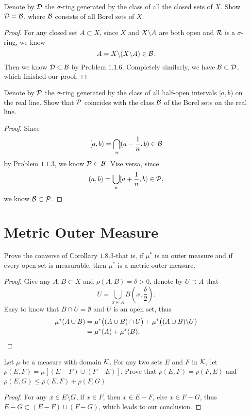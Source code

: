 \begin{pro}%
	Denote by $\mathcal{D}$ the $\sigma$-ring generated by the class of all the closed sets of $X$. Show $\mathcal{D}=\mathcal{B}$, where $\mathcal{B}$ consists of all Borel sets of $X$.
\end{pro}
\begin{proof}
	For any closed set $A\subset X$, since $X$ and $X\backslash A$ are both open and $\mathcal{R}$ is a $\sigma$-ring, we know
	\[A=X\backslash(X\backslash A)\in \mathcal{B}.\]
	 Then we know $\mathcal{D}\subset\mathcal{B}$ by Problem $1.1.6$. Completely similarly, we have $\mathcal{B}\subset\mathcal{D}$, which finished our proof.
\end{proof}

\begin{pro}%
	Denote by $\mathcal{P}$ the $\sigma$-ring generated by the class of all half-open intervals $[a,b)$ on the real line. Show that $\mathcal{P}$ coincides with the class $\mathcal{B}$ of the Borel sets on the real line.
\end{pro}
\begin{proof}
	Since 
	\[[a,b)=\bigcap_{n} (a-\frac{1}{n},b)\in\mathcal{B}\]
	by Problem $1.1.3$, we know $\mathcal{P}\subset \mathcal{B}$. Vise versa, since
	\[(a,b)=\bigcup_{n} [a+\frac{1}{n},b)\in\mathcal{P},\]
	we know $\mathcal{B}\subset\mathcal{P}$. 
\end{proof}

\section{Metric Outer Measure}
\begin{pro}%
	Prove the converse of Corollary $1.8.3$-that is, if $\mu^*$ is an outer measure and if every open set is measurable, then $\mu^*$ is a metric outer measure.
\end{pro}
\begin{proof}
	Give any $A,B\subset X$ and $\rho(A,B)=\delta>0$, denote by $U\supset A$ that 
	\[U=\bigcup_{x\in A} B(x,\frac{\delta}{2}).\]
	Easy to know that $B\cap U=\emptyset$ and $U$ is an open set, thus
	\begin{align*}
		\mu^*(A\cup B)&=\mu^*\big((A\cup B)\cap U\big)+\mu^*\big((A\cup B)\backslash U\big)\\
		&=\mu^*(A)+\mu^*(B).
	\end{align*}
\end{proof}

\begin{pro}%
	Let $\mu$ be a measure with domain $\mathcal{K}$. For any two sets $E$ and $F$ in $\mathcal{K}$, let $\rho(E,F)=\mu[(E-F)\cup(F-E)].$ Prove that $\rho(E,F)=\rho(F,E)$ and $\rho(E,G)\leq\rho(E,F)+\rho(F,G)$.
\end{pro}
\begin{proof}
	For any $x\in E\backslash G$, if $x\in F$, then $x\in E-F$, else $x\in F-G$, thus $E-G\subset(E-F)\cup (F-G)$, which leads to our conclusion.
\end{proof}

